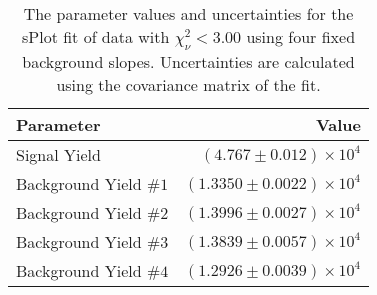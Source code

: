 
\begin{table}[ht]
    \begin{center}
        \begin{tabular}{lr}\toprule
            Parameter & Value \\\midrule
            Signal Yield & $(4.767 \pm 0.012) \times 10^{4}$ \\
            Background Yield $\#1$ & $(1.3350 \pm 0.0022) \times 10^{4}$ \\
            Background Yield $\#2$ & $(1.3996 \pm 0.0027) \times 10^{4}$ \\
            Background Yield $\#3$ & $(1.3839 \pm 0.0057) \times 10^{4}$ \\
            Background Yield $\#4$ & $(1.2926 \pm 0.0039) \times 10^{4}$ \\\bottomrule
        \end{tabular}
        \caption{The parameter values and uncertainties for the sPlot fit of data with $\chi^2_\nu < 3.00$ using four fixed background slopes. Uncertainties are calculated using the covariance matrix of the fit.}\label{tab:splot-fit-results-chisqdof-3.00-fixed-4}
    \end{center}
\end{table}

